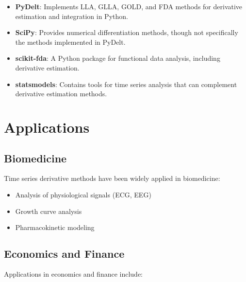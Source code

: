 \documentclass{article}
\begin{document}
\begin{itemize}
    \item \textbf{PyDelt}: Implements LLA, GLLA, GOLD, and FDA methods for derivative estimation and integration in Python.
    
    \item \textbf{SciPy}: Provides numerical differentiation methods, though not specifically the methods implemented in PyDelt.
    
    \item \textbf{scikit-fda}: A Python package for functional data analysis, including derivative estimation.
    
    \item \textbf{statsmodels}: Contains tools for time series analysis that can complement derivative estimation methods.
\end{itemize}

\section{Applications}

\subsection{Biomedicine}

Time series derivative methods have been widely applied in biomedicine:

\begin{itemize}
    \item Analysis of physiological signals (ECG, EEG)
    \item Growth curve analysis
    \item Pharmacokinetic modeling
\end{itemize}

\subsection{Economics and Finance}

Applications in economics and finance include:
\end{document}
